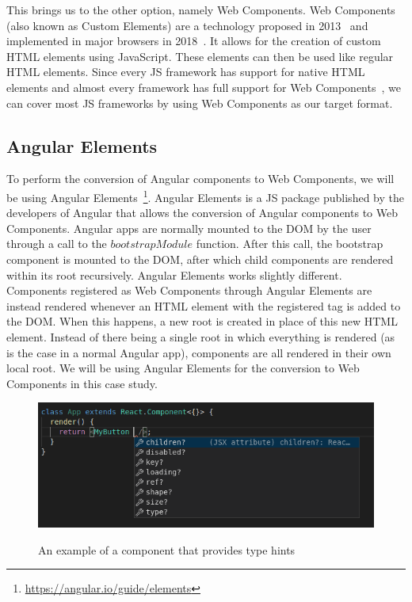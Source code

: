 This brings us to the other option, namely Web Components. Web Components (also known as Custom Elements) are a technology proposed in 2013~\cite{customelements-initial} and implemented in major browsers in 2018~\cite{webcomponents-support}. It allows for the creation of custom HTML elements using JavaScript. These elements can then be used like regular HTML elements. Since every JS framework has support for native HTML elements and almost every framework has full support for Web Components~\cite{custom-elements-everyhwere}, we can cover most JS frameworks by using Web Components as our target format.

\subsection{Angular Elements}\label{sec:bg-angularelements}
To perform the conversion of Angular components to Web Components, we will be using Angular Elements~\footnote{\url{https://angular.io/guide/elements}}. Angular Elements is a JS package published by the developers of Angular that allows the conversion of Angular components to Web Components. Angular apps are normally mounted to the DOM by the user through a call to the \(bootstrapModule\) function. After this call, the bootstrap component is mounted to the DOM, after which child components are rendered within its root recursively. Angular Elements works slightly different. Components registered as Web Components through Angular Elements are instead rendered whenever an HTML element with the registered tag is added to the DOM\@. When this happens, a new root is created in place of this new HTML element. Instead of there being a single root in which everything is rendered (as is the case in a normal Angular app), components are all rendered in their own local root. We will be using Angular Elements for the conversion to Web Components in this case study.

\begin{figure}[h]
	\caption{An example of a component that provides type hints}
	\includegraphics[width=\columnwidth]{figures/background/hinting.png}
	\label{fig:bg-hinting}
	\centering
\end{figure}

